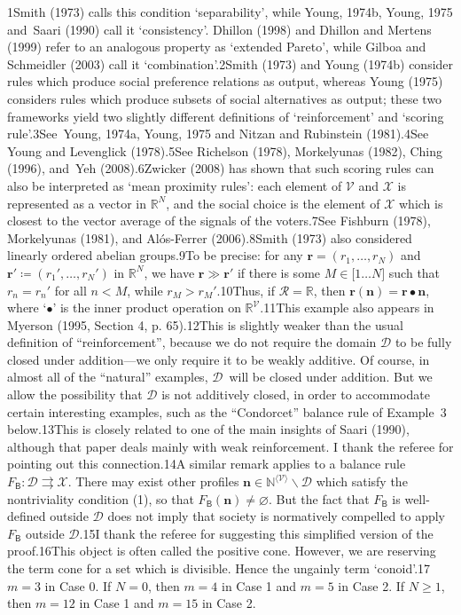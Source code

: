 \documentclass[
]{article}
\begin{document}
1Smith (1973) calls this condition `separability', while Young, 1974b,
Young, 1975 and~Saari (1990) call it `consistency'. Dhillon (1998) and
Dhillon and Mertens (1999) refer to an analogous property as `extended
Pareto', while Gilboa and Schmeidler (2003) call it `combination'.2Smith
(1973) and Young (1974b) consider rules which produce social preference
relations as output, whereas Young (1975) considers rules which produce
subsets of social alternatives as output; these two frameworks yield two
slightly different definitions of `reinforcement' and `scoring
rule'.3See~Young, 1974a, Young, 1975 and Nitzan and Rubinstein
(1981).4See Young and Levenglick (1978).5See Richelson (1978),
Morkelyunas (1982), Ching (1996), and~Yeh (2008).6Zwicker (2008) has
shown that such scoring rules can also be interpreted as `mean proximity
rules': each element of \(\mathcal{V}\) and \(\mathcal{X}\) is
represented as a vector in \(\mathbb{R}^{N}\), and the social choice is
the element of \(\mathcal{X}\) which is closest to the vector average of
the signals of the voters.7See Fishburn (1978), Morkelyunas (1981), and
Alós-Ferrer (2006).8Smith (1973) also considered linearly ordered
abelian groups.9To be precise: for any
\(\mathbf{r} = \left( r_{1},\ldots,r_{N} \right)\) and
\(\mathbf{r}' ≔ \left( r_{1}',\ldots,r_{N}' \right)\) in
\(\mathbb{R}^{N}\), we have \(\mathbf{r} \gg \mathbf{r}'\) if there is
some \(M \in \lbrack 1\ldots N\rbrack\) such that \(r_{n} = r_{n}'\) for
all \(n < M\), while \(r_{M} > r_{M}'\).10Thus, if
\(\mathcal{R} = \mathbb{R}\), then
\(\mathbf{r}\left( \mathbf{n} \right) = \mathbf{r}\bullet\mathbf{n}\),
where `\(\bullet\)' is the inner product operation on
\(\mathbb{R}^{\mathcal{V}}\).11This example also appears in Myerson
(1995, Section 4, p. 65).12This is slightly weaker than the usual
definition of ``reinforcement'', because we do not require the domain
\(\mathcal{D}\) to be fully closed under addition---we only require it
to be weakly additive. Of course, in almost all of the ``natural''
examples, \(\mathcal{D}\)~will be closed under addition. But we allow
the possibility that \(\mathcal{D}\) is not additively closed, in order
to accommodate certain interesting examples, such as the ``Condorcet''
balance rule of Example~3 below.13This is closely related to one of the
main insights of Saari (1990), although that paper deals mainly with
weak reinforcement. I thank the referee for pointing out this
connection.14A similar remark applies to a balance rule
\(\left. F_{\mathsf{B}}:\mathcal{D}\rightrightarrows\mathcal{X} \right.\).
There may exist other profiles
\(\mathbf{n} \in \mathbb{N}^{\langle\mathcal{V}\rangle} \smallsetminus \mathcal{D}\)
which satisfy the nontriviality condition (1), so that
\(F_{\mathsf{B}}\left( \mathbf{n} \right) \neq \varnothing\).
But the fact that \(F_{\mathsf{B}}\) is well-defined outside
\(\mathcal{D}\) does not imply that society is normatively compelled to
apply \(F_{\mathsf{B}}\) outside \(\mathcal{D}\).15I thank the referee
for suggesting this simplified version of the proof.16This object is
often called the positive cone. However, we are reserving the term cone
for a set which is divisible. Hence the ungainly term
`conoid'.17\(m = 3\) in Case 0. If \(N = 0\), then \(m = 4\) in Case 1
and \(m = 5\) in Case 2. If \(N \geq 1\), then \(m = 12\) in Case 1 and
\(m = 15\) in Case 2.
\end{document}
